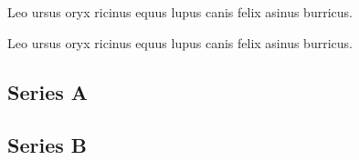 \documentclass[draft]{article}
\begin{document}
\begin{pages}
\begin{Leftside}
\beginnumbering
\pstart
Leo  ursus  oryx  ricinus  equus 
lupus  canis  felix  asinus  burricus.

\pend
\endnumbering
\end{Leftside}

\begin{Rightside}
\beginnumbering
\pstart
Leo  ursus  oryx  ricinus  equus 
lupus  canis  felix  asinus  burricus.

\pend
\endnumbering
\end{Rightside}
\end{pages}
\Pages
\subsection*{Series A}
\subsection*{Series B}
\end{document}
